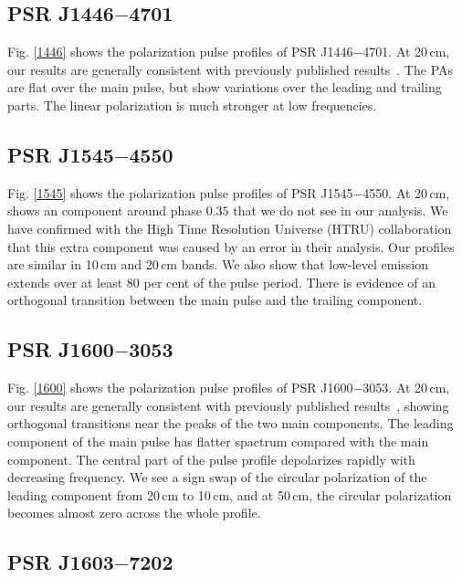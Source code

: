 \documentclass[useAMS,usenatbib]{mn2e}
\begin{document}
\subsection{PSR J1446$-$4701}

Fig. \ref{1446} shows the polarization pulse profiles of 
PSR J1446$-$4701.
%
At 20\,cm, our results are generally consistent with previously published
results~\citep{Keith12}.
%
The PAs are flat over the main pulse, but show variations over the leading and 
trailing parts.
%
The linear polarization is much stronger at low frequencies.

\subsection{PSR J1545$-$4550}

Fig. \ref{1545} shows the polarization pulse profiles of 
PSR J1545$-$4550.
%
At 20\,cm, \citet{Burgay13} shows an component around phase $0.35$ that 
we do not see in our analysis. We have confirmed with the High Time Resolution 
Universe (HTRU) collaboration that this extra component was caused by an error 
in their analysis.  
%
Our profiles are similar in 10\,cm and 20\,cm bands.
%
We also show that low-level emission extends over at least $80$ 
per cent of the pulse period.
%
There is evidence of an orthogonal transition between the main pulse and 
the trailing component.

\subsection{PSR J1600$-$3053}

Fig. \ref{1600} shows the polarization pulse profiles of 
PSR J1600$-$3053.
%
At 20\,cm, our results are generally consistent with previously published
results~\citep{Ord04,Yan11}, showing orthogonal transitions near the 
peaks of the two main components.
%
The leading component of the main pulse has flatter spactrum compared with 
the main component.
%
The central part of the pulse profile depolarizes rapidly with decreasing 
frequency. 
%
We see a sign swap of the circular polarization of the leading component 
from 20\,cm to 10\,cm, and at 50\,cm, the circular polarization becomes almost 
zero across the whole profile.


\subsection{PSR J1603$-$7202}
\end{document}
